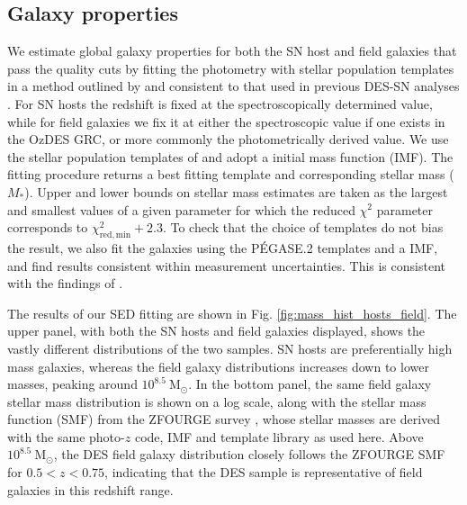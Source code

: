 \documentclass[fleqn,usenatbib]{mnras}
\begin{document}
\subsection{Galaxy properties \label{subsec:properties}}

We estimate global galaxy properties for both the SN host and field galaxies that pass the quality cuts by fitting the photometry with stellar population templates in a method outlined by \citet{Sullivan2006} and consistent to that used in previous DES-SN analyses \citep{Kelsey2020,Smith2020,Wiseman2020}. For SN hosts the redshift is fixed at the spectroscopically determined value, while for field galaxies we fix it at either the spectroscopic value if one exists in the OzDES GRC, or more commonly the photometrically derived value. We use the stellar population templates of \citet{Bruzual2003} and adopt a \citet{Chabrier2003} initial mass function (IMF). The fitting procedure returns a best fitting template and corresponding stellar mass ($M_*$). Upper and lower bounds on stellar mass estimates are taken as the largest and smallest values of a given parameter for which the reduced $\chi^2$ parameter corresponds to $\chi^2_{\mathrm{red, min}} +2.3$. To check that the choice of templates do not bias the result, we also fit the galaxies using the P\'EGASE.2 templates \citep{Fioc1997,LeBorgne2002} and a \citet{Kroupa2001} IMF, and find results consistent within measurement uncertainties. This is consistent with the findings of \citet{Smith2020}. 

The results of our SED fitting are shown in Fig. \ref{fig:mass_hist_hosts_field}. The upper panel, with both the SN hosts and field galaxies displayed, shows the vastly different distributions of the two samples. SN hosts are preferentially high mass galaxies, whereas the field galaxy distributions increases down to lower masses, peaking around $10^{8.5}~\mathrm{M}_{\odot}$. In the bottom panel, the same field galaxy stellar mass distribution is shown on a log scale, along with the stellar mass function (SMF) from the ZFOURGE survey \citep{Tomczak2014}, whose stellar masses are derived with the same photo-$z$ code, IMF and template library as used here. Above $10^{8.5}~\mathrm{M}_{\odot}$, the DES field galaxy distribution closely follows the ZFOURGE SMF for $0.5<z<0.75$, indicating that the DES sample is representative of field galaxies in this redshift range.%
\end{document}
